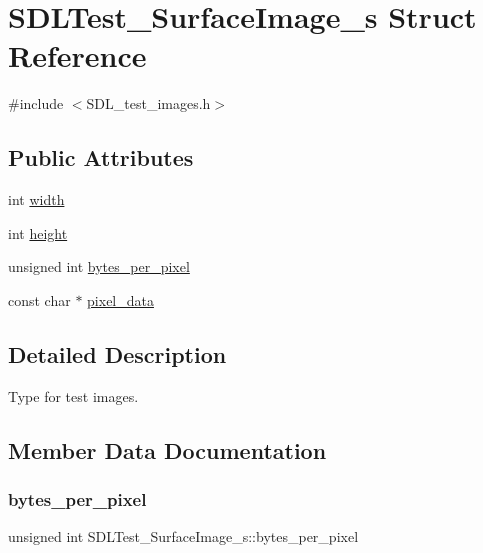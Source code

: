 \hypertarget{struct_s_d_l_test___surface_image__s}{}\section{S\+D\+L\+Test\+\_\+\+Surface\+Image\+\_\+s Struct Reference}
\label{struct_s_d_l_test___surface_image__s}


{\ttfamily \#include $<$S\+D\+L\+\_\+test\+\_\+images.\+h$>$}

\subsection*{Public Attributes}
\begin{DoxyCompactItemize}
\item 
int \mbox{\hyperlink{struct_s_d_l_test___surface_image__s_a3cbacf6b015a22832ab4d3f509719609}{width}}
\item 
int \mbox{\hyperlink{struct_s_d_l_test___surface_image__s_a310092874695556e4b7f1f63aec24213}{height}}
\item 
unsigned int \mbox{\hyperlink{struct_s_d_l_test___surface_image__s_a2daf91bab3d79fb9dfa25e8ade43e606}{bytes\+\_\+per\+\_\+pixel}}
\item 
const char $\ast$ \mbox{\hyperlink{struct_s_d_l_test___surface_image__s_acf2d3006bea5690f564d3003d1512fa7}{pixel\+\_\+data}}
\end{DoxyCompactItemize}


\subsection{Detailed Description}
Type for test images. 

\subsection{Member Data Documentation}
\mbox{\label{struct_s_d_l_test___surface_image__s_a2daf91bab3d79fb9dfa25e8ade43e606}} 
\subsubsection{\texorpdfstring{bytes\+\_\+per\+\_\+pixel}{bytes\_per\_pixel}}
{\footnotesize\ttfamily unsigned int S\+D\+L\+Test\+\_\+\+Surface\+Image\+\_\+s\+::bytes\+\_\+per\+\_\+pixel}


